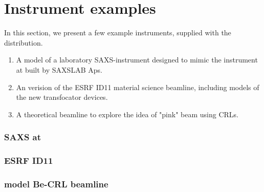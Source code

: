 
\chapter{Instrument examples}
\label{s:instrument}

In this section, we present a few example instruments, supplied with the \MCX distribution.
\begin{enumerate}
\item A model of a laboratory SAXS-instrument designed to mimic the instrument at \Lifelong built by SAXSLAB Aps.
\item An verision of the ESRF ID11 material science beamline, including models of the new transfocator devices.
\item A theoretical beamline to explore the idea of "pink" beam using CRLs.
\end{enumerate}


\subsection{SAXS at \Lifelong}
\label{ss:saxs}


\subsection{ESRF ID11}
\label{ss:id11}

\subsection{model Be-CRL beamline}
\label{ss:be-crl}

